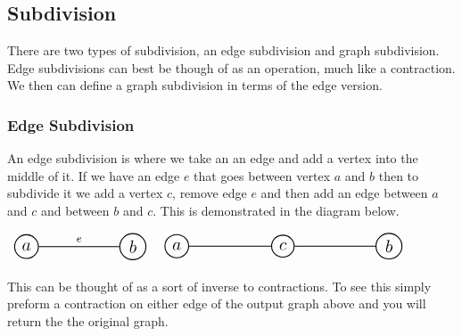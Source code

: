 \documentclass{article}
\begin{document}
\subsection{Subdivision}
There are two types of subdivision, an edge subdivision and graph subdivision. Edge subdivisions can best be though of as an operation, much like a contraction. We then can define a graph subdivision in terms of the edge version.

\subsubsection{Edge Subdivision}
An edge subdivision is where we take an an edge and add a vertex into the middle of it. If we have an edge $e$ that goes between vertex $a$ and $b$ then to subdivide it we add a vertex $c$, remove edge $e$ and then add an edge between $a$ and $c$ and between $b$ and $c$. This is demonstrated in the diagram below.
\begin{center}
	$
	\begin{array}{l}
		\begin{tikzpicture}[auto, node distance=3cm, every loop/.style={},
		thick,main node/.style={circle,draw,font=\sffamily\Large\bfseries}]
		
			\node[main node] (1) {$a$};
			\node[main node] (2) [right of=1] {$b$};
			
			\path[every node/.style={font=\sffamily\small}]
			(1)	edge node {$e$} (2);
		\end{tikzpicture}
	\end{array}
	$
	\scalebox{2}{$\to$}
	$
	\begin{array}{l}
		\begin{tikzpicture}[auto, node distance=3cm, every loop/.style={},
thick,main node/.style={circle,draw,font=\sffamily\Large\bfseries}]

		\node[main node] (1) {$a$};
		\node[main node] (3) [right of=1] {$c$};
		\node[main node] (2) [right of=3] {$b$};
		
		\path[every node/.style={font=\sffamily\small}]
		(1)	edge node {} (3)
		(2) edge node {} (3);
		\end{tikzpicture}
	\end{array}
	$
\end{center}

This can be thought of as a sort of inverse to contractions. To see this simply preform a contraction on either edge of the output graph above and you will return the the original graph.
\end{document}
